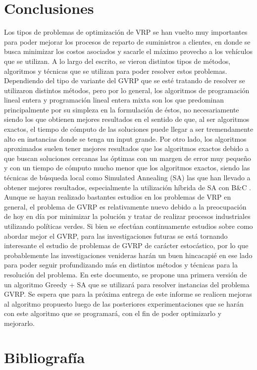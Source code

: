 \documentclass[letter, 10pt]{article}
\begin{document}
\section{Conclusiones}
\label{conclusiones}
Los tipos de problemas de optimización de VRP se han vuelto muy importantes para poder mejorar los procesos de reparto de suministros a clientes, en donde se busca minimizar los costos asociados y sacarle el máximo provecho a los vehículos que se utilizan. A lo largo del escrito, se vieron distintos tipos de métodos, algoritmos y técnicas que se utilizan para poder resolver estos problemas.
Dependiendo del tipo de variante del GVRP que se esté tratando de resolver se utilizaron distintos métodos, pero por lo general, los algoritmos de programación lineal entera y programación lineal entera mixta son los que predominan principalmente por su simpleza en la formulación de éstos, no necesariamente siendo los que obtienen mejores resultados en el sentido de que, al ser algoritmos exactos, el tiempo de cómputo de las soluciones puede llegar a ser tremendamente alto en instancias donde se tenga un input grande. Por otro lado, los algoritmos aproximados suelen tener mejores resultados que los algoritmos exactos debido a que buscan soluciones cercanas las óptimas con un margen de error muy pequeño y con un tiempo de cómputo mucho menor que los algoritmos exactos, siendo las técnicas de búsqueda local como Simulated Annealing (SA) las que han llevado a obtener mejores resultados, especialmente la utilización híbrida de SA con B\&C \cite{BYCSA}. Aunque se hayan realizado bastantes estudios en los problemas de VRP en general, el problema de GVRP es relativamente nuevo debido a la preocupación de hoy en día por minimizar la polución y tratar de realizar procesos industriales utilizando políticas verdes. Si bien se efectúan continuamente estudios sobre como abordar mejor el GVRP, para las investigaciones futuras se está tornando interesante el estudio de problemas de GVRP de carácter estocástico, por lo que probablemente las investigaciones venideras harán un buen hincacapié en ese lado para poder seguir profundizando más en distintos métodos y técnicas para la resolución del problema. En este documento, se propone una primera versión de un algoritmo Greedy + SA que se utilizará para resolver instancias del problema GVRP. Se espera que para la próxima entrega de este informe se realicen mejoras al algoritmo propuesto luego de las posteriores experimentaciones que se harán con este algoritmo que se programará, con el fin de poder optimizarlo y mejorarlo.


\section{Bibliograf\'ia}


\end{document}
